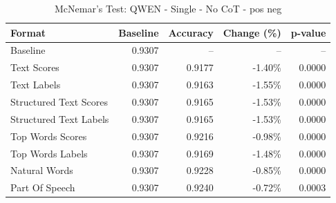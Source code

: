 \begin{table}[htbp]
\centering
\caption{McNemar's Test: QWEN - Single - No CoT - pos neg}
\label{tab:qwen-single-no_chain_of_thought-pos_neg}
\begin{tabular}{lrrrr}
\toprule
Format & Baseline & Accuracy & Change (\%) & p-value \\
\midrule
Baseline & 0.9307 & -- & -- & -- \\
Text Scores & 0.9307 & 0.9177 & -1.40\% & 0.0000 \\
Text Labels & 0.9307 & 0.9163 & -1.55\% & 0.0000 \\
Structured Text Scores & 0.9307 & 0.9165 & -1.53\% & 0.0000 \\
Structured Text Labels & 0.9307 & 0.9165 & -1.53\% & 0.0000 \\
Top Words Scores & 0.9307 & 0.9216 & -0.98\% & 0.0000 \\
Top Words Labels & 0.9307 & 0.9169 & -1.48\% & 0.0000 \\
Natural Words & 0.9307 & 0.9228 & -0.85\% & 0.0000 \\
Part Of Speech & 0.9307 & 0.9240 & -0.72\% & 0.0003 \\
\bottomrule
\end{tabular}
\end{table}